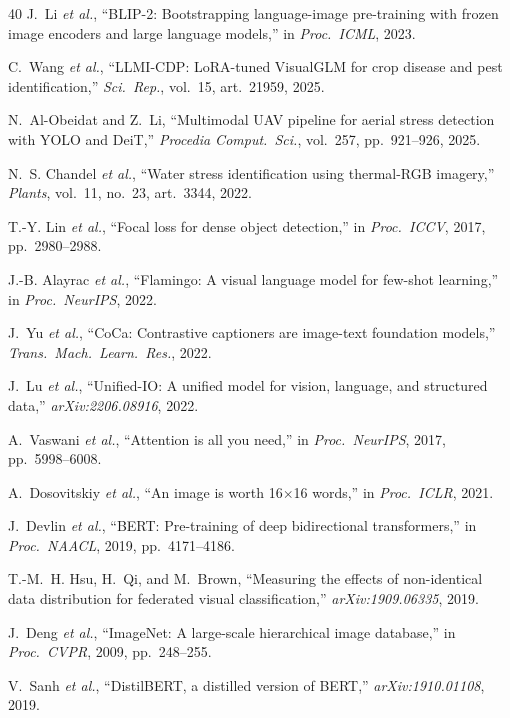 \documentclass[conference]{IEEEtran}
\begin{document}
\begin{thebibliography}{40}
J.~Li \emph{et al.},
``BLIP-2: Bootstrapping language-image pre-training with frozen image
encoders and large language models,''
in \emph{Proc.\ ICML}, 2023.

C.~Wang \emph{et al.},
``LLMI-CDP: LoRA-tuned VisualGLM for crop disease and pest identification,''
\emph{Sci.\ Rep.}, vol.\ 15, art.\ 21959, 2025.

N.~Al-Obeidat and Z.~Li,
``Multimodal UAV pipeline for aerial stress detection with YOLO and DeiT,''
\emph{Procedia Comput.\ Sci.}, vol.\ 257, pp.\ 921--926, 2025.

N.~S. Chandel \emph{et al.},
``Water stress identification using thermal-RGB imagery,''
\emph{Plants}, vol.\ 11, no.\ 23, art.\ 3344, 2022.

T.-Y. Lin \emph{et al.},
``Focal loss for dense object detection,''
in \emph{Proc.\ ICCV}, 2017, pp.\ 2980--2988.

J.-B. Alayrac \emph{et al.},
``Flamingo: A visual language model for few-shot learning,''
in \emph{Proc.\ NeurIPS}, 2022.

J.~Yu \emph{et al.},
``CoCa: Contrastive captioners are image-text foundation models,''
\emph{Trans.\ Mach.\ Learn.\ Res.}, 2022.

J.~Lu \emph{et al.},
``Unified-IO: A unified model for vision, language, and structured data,''
\emph{arXiv:2206.08916}, 2022.

A.~Vaswani \emph{et al.},
``Attention is all you need,''
in \emph{Proc.\ NeurIPS}, 2017, pp.\ 5998--6008.

A.~Dosovitskiy \emph{et al.},
``An image is worth 16$\times$16 words,''
in \emph{Proc.\ ICLR}, 2021.

J.~Devlin \emph{et al.},
``BERT: Pre-training of deep bidirectional transformers,''
in \emph{Proc.\ NAACL}, 2019, pp.\ 4171--4186.

T.-M.~H. Hsu, H.~Qi, and M.~Brown,
``Measuring the effects of non-identical data distribution for federated
visual classification,''
\emph{arXiv:1909.06335}, 2019.

J.~Deng \emph{et al.},
``ImageNet: A large-scale hierarchical image database,''
in \emph{Proc.\ CVPR}, 2009, pp.\ 248--255.

V.~Sanh \emph{et al.},
``DistilBERT, a distilled version of BERT,''
\emph{arXiv:1910.01108}, 2019.


\end{thebibliography}
\end{document}
